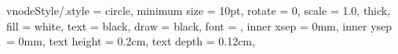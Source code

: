 




\tikzset
{
    vnodeStyle/.style =
    {
        circle,                                 %
        minimum size    = 10pt,                %
        rotate          = 0,                    %
        scale           = 1.0,                  %
        thick,                                  %
        fill            = white,             %
        text            = black,                %
        draw            = black,                %
        font            = \scriptsize,              %
        inner xsep      = 0mm,                  %
        inner ysep      = 0mm,                  %
        text height     = 0.2cm,
        text depth      = 0.12cm,
    }
}






